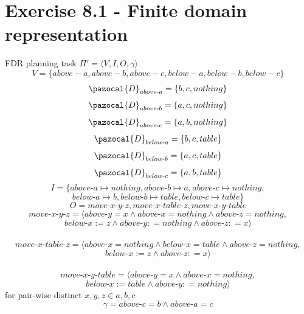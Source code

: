\documentclass[12pt,a4paper]{article}
\begin{document}
\section*{Exercise 8.1 - Finite domain representation}
	FDR planning task $\Pi' = \langle V, I, O, \gamma \rangle$\\
\[V = \{ above-a, above-b, above-c, below-a, below-b, below-c \} \]
\[ \pazocal{D}_{above\text{-}a} = \{b, c, nothing\} \]
\[ \pazocal{D}_{above\text{-}b} = \{a, c, nothing\} \]
\[ \pazocal{D}_{above\text{-}c} = \{a, b, nothing\} \]
\[ \pazocal{D}_{below\text{-}a} = \{b, c, table\} \]
\[ \pazocal{D}_{below\text{-}b} = \{a, c, table\} \]
\[ \pazocal{D}_{below\text{-}c} = \{a, b, table\} \]
\[I = \{above\text{-}a \mapsto nothing, above\text{-}b \mapsto a, above\text{-}c \mapsto nothing,\]
\[ below\text{-}a \mapsto b, below\text{-}b \mapsto table, below\text{-}c\mapsto table\}\]
\[O = {move\text{-}x\text{-}y\text{-}z, move\text{-}x\text{-}table\text{-}z, move\text{-}x\text{-}y\text{-}table}\]
\[move\text{-}x\text{-}y\text{-}z =\langle above\text{-}y = x \land above\text{-}x = nothing \land above\text{-}z = nothing,\]
\[ below\text{-}x := z \land above\text{-}y: = nothing \land above\text{-}z: = x \rangle \]\\
\[move\text{-}x\text{-}table\text{-}z =\langle above\text{-}x = nothing \land below\text{-}x = table \land above\text{-}z = nothing,\]
\[ below\text{-}x := z \land above\text{-}z: = x \rangle \]\\
\[move\text{-}x\text{-}y\text{-}table =\langle above\text{-}y = x \land above\text{-}x = nothing,\]
\[ below\text{-}x :=  table \land above\text{-}y: = nothing \rangle \]
for pair-wise distinct $x,y,z \in {a, b, c}$
\[\gamma = above\text{-}c = b \land above\text{-}a = c\]
\end{document}
